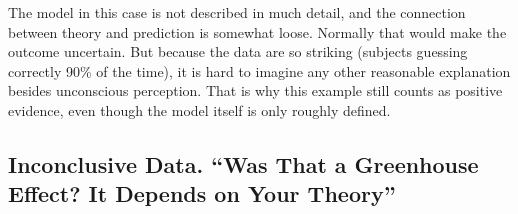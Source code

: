 \documentclass[
  12pt,
]{book}
\begin{document}
The model in this case is not described in much detail, and the connection between theory and prediction is somewhat loose. Normally that would make the outcome uncertain. But because the data are so striking (subjects guessing correctly 90\% of the time), it is hard to imagine any other reasonable explanation besides unconscious perception. That is why this example still counts as positive evidence, even though the model itself is only roughly defined.

\subsection{Inconclusive Data. ``Was That a Greenhouse Effect? It Depends on Your Theory''}\label{inconclusive-data.-was-that-a-greenhouse-effect-it-depends-on-your-theory}
\end{document}
